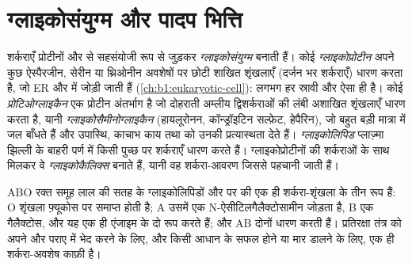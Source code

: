 \section{ग्लाइकोसंयुग्म और पादप भित्ति}

\begin{definition}[ग्लाइकोप्रोटीन, प्रोटिओग्लाइकैन, ग्लाइकोलिपिड]\label{def:b1:carbohydrates:glycoconjugate}
शर्कराएँ प्रोटीनों और  से सहसंयोजी रूप से जुड़कर
\emph{ग्लाइकोसंयुग्म} बनाती हैं। कोई \emph{ग्लाइकोप्रोटीन}
अपने कुछ ऐस्पैरजीन, सेरीन या थ्रिओनीन अवशेषों पर छोटी शाखित शृंखलाएँ
(दर्जन भर शर्कराएँ) धारण करता है, जो ER और  में जोड़ी जाती हैं
(\cref{ch:b1:eukaryotic-cell}): लगभग हर स्रावी और  ऐसा ही
है। कोई \emph{प्रोटिओग्लाइकैन} एक प्रोटीन
अंतर्भाग है जो दोहराती अम्लीय द्विशर्कराओं की लंबी अशाखित शृंखलाएँ
धारण करता है, यानी \emph{ग्लाइकोसैमीनोग्लाइकैन} (हायलूरोनन,
कॉन्ड्रॉइटिन सल्फ़ेट, हेपैरिन), जो बहुत बड़ी मात्रा में जल बाँधते हैं और
उपास्थि, काचाभ काय तथा  को उनकी प्रत्यास्थता देते
हैं। \emph{ग्लाइकोलिपिड} प्लाज़्मा झिल्ली के बाहरी
पर्ण में किसी  पुच्छ पर शर्कराएँ धारण करते हैं। ग्लाइकोप्रोटीनों की
शर्कराओं के साथ मिलकर वे \emph{ग्लाइकोकैलिक्स}
बनाते हैं, यानी वह शर्करा-आवरण जिससे  पहचानी जाती हैं।
\end{definition}

\begin{example}[रक्त समूह]\label{ex:b1:carbohydrates:abo}
ABO रक्त समूह लाल  की सतह के ग्लाइकोलिपिडों और
 पर की एक ही शर्करा-शृंखला के तीन रूप हैं: O शृंखला
फ़्यूकोस पर समाप्त होती है; A उसमें एक N-ऐसीटिलगैलैक्टोसामीन जोड़ता है,
B एक गैलैक्टोस, और यह एक ही एंजाइम के दो रूप करते हैं; और AB 
दोनों धारण करती हैं। प्रतिरक्षा तंत्र को अपने और पराए में भेद करने के लिए,
और किसी आधान के सफल होने या मार डालने के लिए, एक ही शर्करा-अवशेष काफ़ी
है।
\end{example}

